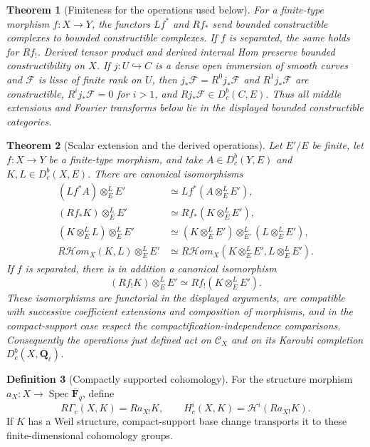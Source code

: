 \documentclass[10pt]{article}
\newtheorem{theorem}{Theorem}[section]
\theoremstyle{definition}
\newtheorem{definition}[theorem]{Definition}
\newcommand{\Fbar}{\overline{\mathbf F}_q}
\newcommand{\Qlb}{\overline{\mathbf Q}_\ell}
\newcommand{\Dbc}{D^b_c}
\begin{document}
\begin{theorem}[Finiteness for the operations used below]
For a finite-type morphism \(f:X\to Y\), the functors \(Lf^*\) and \(Rf_*\)
send bounded constructible complexes to bounded constructible complexes.  If
\(f\) is separated, the same holds for \(Rf_!\).  Derived tensor product and
derived internal Hom preserve bounded constructibility on \(X\).  If
\(j:U\hookrightarrow C\) is a dense open
immersion of smooth curves and \(\mathcal F\) is lisse of finite rank on
\(U\), then \(j_*\mathcal F=R^0j_*\mathcal F\) and \(R^1j_*\mathcal F\)
are constructible, \(R^ij_*\mathcal F=0\) for \(i>1\), and
\(Rj_*\mathcal F\in\Dbc(C,E)\).  Thus all middle extensions and Fourier
transforms below lie in the displayed bounded constructible categories.
\end{theorem}

\begin{theorem}[Scalar extension and the derived operations]
Let \(E'/E\) be finite, let \(f:X\to Y\) be a finite-type morphism, and
take \(A\in\Dbc(Y,E)\) and \(K,L\in\Dbc(X,E)\).  There are canonical
isomorphisms
\[
\begin{aligned}
 (Lf^*A)\otimes_E^LE'
   &\simeq Lf^*(A\otimes_E^LE'),\\
 (Rf_*K)\otimes_E^LE'
   &\simeq Rf_*(K\otimes_E^LE'),\\
 (K\otimes_E^LL)\otimes_E^LE'
   &\simeq (K\otimes_E^LE')\otimes_{E'}^L(L\otimes_E^LE'),\\
 R\mathcal Hom_X(K,L)\otimes_E^LE'
   &\simeq R\mathcal Hom_X(K\otimes_E^LE',L\otimes_E^LE').
\end{aligned}
\]
If \(f\) is separated, there is in addition a canonical isomorphism
\[
 (Rf_!K)\otimes_E^LE'\simeq Rf_!(K\otimes_E^LE').
\]
These isomorphisms are functorial in the displayed arguments, are compatible
with successive coefficient extensions and composition of morphisms, and in
the compact-support case respect the compactification-independence
comparisons.  Consequently the operations just defined act on
\(\mathcal C_X\) and on its Karoubi completion \(\Dbc(X,\Qlb)\).
\end{theorem}

\begin{definition}[Compactly supported cohomology]
For the structure morphism \(a_X:X\to\operatorname{Spec}\Fbar\), define
\[
 R\Gamma_c(X,K)=Ra_{X!}K,\qquad
 H_c^i(X,K)=\mathcal H^i(Ra_{X!}K).
\]
If \(K\) has a Weil structure, compact-support base change transports it to
these finite-dimensional cohomology groups.
\end{definition}
\end{document}
